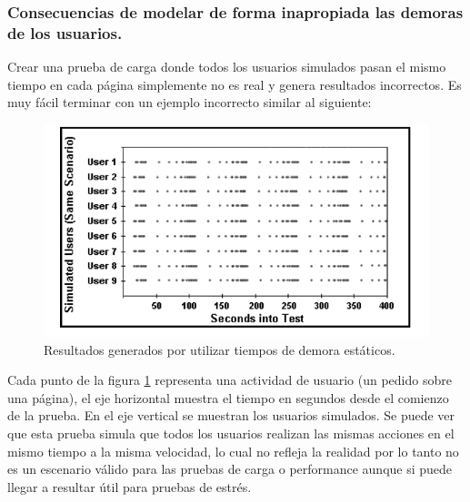 \subsubsection{Consecuencias de modelar de forma inapropiada las demoras de los usuarios.}
Crear una prueba de carga donde todos los usuarios simulados pasan el mismo tiempo en cada página simplemente no es real y genera resultados incorrectos. Es muy fácil terminar
con un ejemplo incorrecto similar al siguiente:
\begin{figure}[h!]
\centering
\includegraphics[width=1\textwidth]{figuras/libro_azul/resultados_tiempos_demora_estaticos.png}
  \caption{Resultados generados por utilizar tiempos de demora estáticos.}
  \label{fig.res_demora_estatica}
\end{figure}

Cada punto de la figura \ref{fig.res_demora_estatica} representa una actividad de usuario (un pedido sobre una página), el eje horizontal muestra el tiempo en segundos desde el
comienzo de la prueba. En el eje vertical se muestran los usuarios simulados. Se puede ver que esta prueba simula que todos los usuarios realizan las mismas acciones en el mismo
tiempo a la misma velocidad, lo cual no refleja la realidad por lo tanto no es un escenario válido para las pruebas de carga o performance aunque si puede llegar a resultar útil para
pruebas de estrés.

